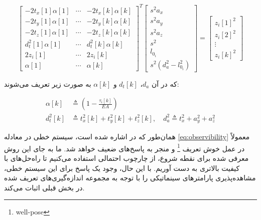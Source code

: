 \begin{equation}\label{eq:observibility}
	\begin{bmatrix}
		-2t_x[1]\alpha[1] & \cdots & -2t_x[k]\alpha[k] \\
		-2t_y[1]\alpha[1] & \cdots & -2t_y[k]\alpha[k] \\
		-2t_z[1]\alpha[1] & \cdots & -2t_z[k]\alpha[k] \\
		d^2_t[1]\alpha[1] & \cdots & d^2_t[k]\alpha[k] \\
		2z_i[1] & \cdots & 2z_i[k] \\
		\alpha[1] & \cdots & \alpha[k]
	\end{bmatrix}^T
	\begin{bmatrix}
		s^2 a_x \\
		s^2 a_y \\
		s^2 a_z \\
		s^2 \\
		l_{0_i} \\
		s^2 (d^2_a - l_{0_i}^2)
	\end{bmatrix}
	=
	\begin{bmatrix}
		z_i[1]^2 \\
		z_i[2]^2 \\
		\vdots \\
		z_i[k]^2
	\end{bmatrix}
\end{equation}

که در آن \( d_a \)، \( d_t[k] \) و \( \alpha[k] \) به صورت زیر تعریف می‌شوند:


\begin{equation}
	\begin{split}
		\alpha[k] &\triangleq \left(1 - \frac{\tau_i[k]}{EA}\right) \\
		d^2_t[k] &\triangleq t^2_x[k] + t^2_y[k] + t^2_z[k], \quad d^2_a \triangleq t^2_x + a^2_y + a^2_z
	\end{split}
\end{equation}

همان‌طور که در 
\cite{blueml2021bias}
اشاره شده است، سیستم خطی در معادله 
\ref{eq:observibility}
معمولاً در عمل خوش تعریف
\footnote{well-pose}
و منجر به پاسخ‌های ضعیف خواهد شد. ما به جای این روش معرفی شده برای نقطه شروع، از چارچوب احتمالی استفاده می‌کنیم تا راه‌حل‌های با کیفیت بالاتری به دست آوریم. با این حال، وجود یک پاسخ برای این سیستم خطی، مشاهده‌پذیری پارامترهای سینماتیکی را با توجه به مجموعه اندازه‌گیری‌های تعریف شده در بخش قبلی اثبات می‌کند.












